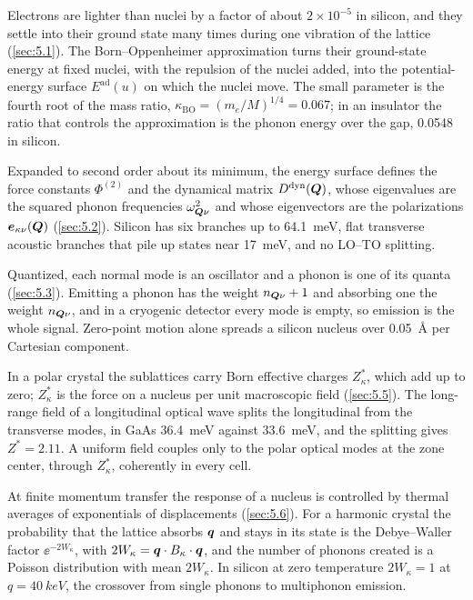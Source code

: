 Electrons are lighter than nuclei by a factor of about $2\times10^{-5}$ in silicon, and they settle into their ground state many times during one vibration of the lattice (\cref{sec:5.1}). The Born--Oppenheimer approximation turns their ground-state energy at fixed nuclei, with the repulsion of the nuclei added, into the potential-energy surface $E^{\mathrm{ad}}(u)$ on which the nuclei move. The small parameter is the fourth root of the mass ratio, $\kappa_{\mathrm{BO}} = (m_e/M)^{1/4} = 0.067$; in an insulator the ratio that controls the approximation is the phonon energy over the gap, 0.0548 in silicon.

Expanded to second order about its minimum, the energy surface defines the force constants $\Phi^{(2)}$ and the dynamical matrix $D^{\mathrm{dyn}}(\bm{Q})$, whose eigenvalues are the squared phonon frequencies $\omega^2_{\bm{Q}\nu}$ and whose eigenvectors are the polarizations $\bm{e}_{\kappa\nu}(\bm{Q})$ (\cref{sec:5.2}). Silicon has six branches up to \SI{64.1}{meV}, flat transverse acoustic branches that pile up states near \SI{17}{meV}, and no LO--TO splitting.

Quantized, each normal mode is an oscillator and a phonon is one of its quanta (\cref{sec:5.3}). Emitting a phonon has the weight $n_{\bm{Q}\nu} + 1$ and absorbing one the weight $n_{\bm{Q}\nu}$, and in a cryogenic detector every mode is empty, so emission is the whole signal. Zero-point motion alone spreads a silicon nucleus over \SI{0.05}{\angstrom} per Cartesian component.

In a polar crystal the sublattices carry Born effective charges $Z^*_\kappa$, which add up to zero; $Z^*_\kappa$ is the force on a nucleus per unit macroscopic field (\cref{sec:5.5}). The long-range field of a longitudinal optical wave splits the longitudinal from the transverse modes, in GaAs \SI{36.4}{meV} against \SI{33.6}{meV}, and the splitting gives $Z^* = 2.11$. A uniform field couples only to the polar optical modes at the zone center, through $Z^*_\kappa$, coherently in every cell.

At finite momentum transfer the response of a nucleus is controlled by thermal averages of exponentials of displacements (\cref{sec:5.6}). For a harmonic crystal the probability that the lattice absorbs $\bm{q}$ and stays in its state is the Debye--Waller factor $\ee^{-2W_\kappa}$, with $2W_\kappa = \bm{q}\cdot B_\kappa\cdot\bm{q}$, and the number of phonons created is a Poisson distribution with mean $2W_\kappa$. In silicon at zero temperature $2W_\kappa = 1$ at $q = \SI{40}{keV}$, the crossover from single phonons to multiphonon emission.

